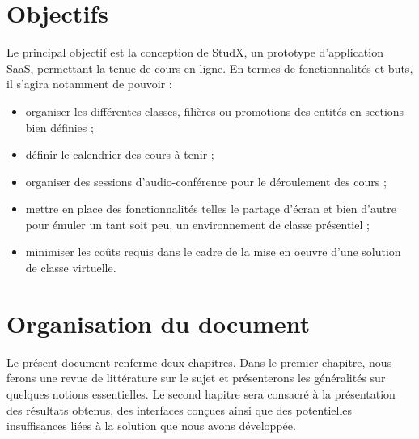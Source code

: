 \section*{Objectifs}
Le principal objectif est la conception de StudX, un prototype d’application SaaS, permettant la tenue de cours en ligne.
En termes de fonctionnalités et buts, il s’agira notamment de pouvoir :
\begin{itemize}
  \item organiser les différentes classes, filières ou promotions des entités en sections bien définies ;
  \item définir le calendrier des cours à tenir ;
  \item organiser des sessions d’audio-conférence pour le déroulement des cours ;
  \item mettre en place des fonctionnalités telles le partage d'écran et bien d’autre pour émuler un tant soit peu, 
    un environnement de classe présentiel ;
  \item minimiser les coûts requis dans le cadre de la mise en oeuvre d’une solution de classe virtuelle.
\end{itemize}

\thispagestyle{plain} %

\section*{Organisation du document}
Le présent document renferme deux chapitres. 
Dans le premier chapitre, nous ferons une revue de littérature sur le sujet 
et présenterons les généralités sur quelques notions essentielles. 
Le second hapitre sera consacré à la présentation des résultats obtenus, 
des interfaces conçues ainsi que des potentielles insuffisances liées à la solution que nous avons développée.
